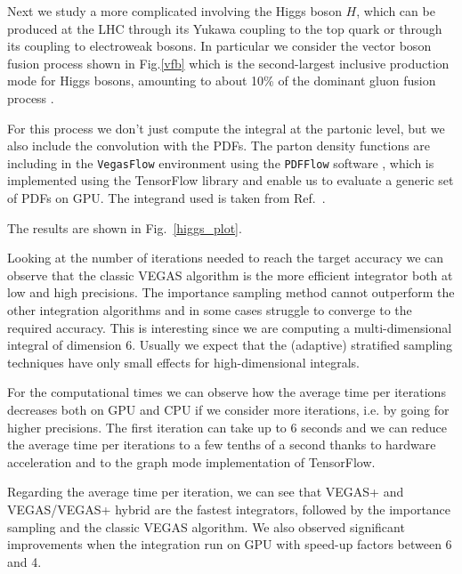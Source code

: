 \documentclass[../main/main.tex]{subfiles}
\begin{document}
Next we study a more complicated involving the Higgs boson $H$, which can be produced at the LHC through its Yukawa coupling to the top quark or through its coupling to electroweak bosons. In particular we consider the vector boson fusion process shown in Fig.\ref{vfb} which is the second-largest inclusive production mode for Higgs bosons, amounting to about 10\% of the dominant gluon fusion process \cite{Cruz_Martinez_2018}.

For this process we don't just compute the integral at the partonic level, but we also include the convolution with the PDFs. 
The parton density functions are including in the \texttt{VegasFlow} environment using the \texttt{PDFFlow} software \cite{Carrazza_2021,juan_m_cruz_martinez_2021_4903010}, which is implemented using the TensorFlow library and enable us to evaluate a generic set of PDFs on GPU. 
The integrand used is taken from Ref.~\cite{juan_m_cruz_martinez_2021_4903010}.

The results are shown in Fig.~\ref{higgs_plot}.

Looking at the number of iterations needed to reach the target accuracy we can observe that the classic VEGAS algorithm is the more efficient integrator both at low and high precisions. The importance sampling method cannot outperform the other integration algorithms and in some cases struggle to converge to the required accuracy. This is interesting since we are computing a multi-dimensional integral of dimension 6. Usually we expect that the (adaptive) stratified sampling techniques have only small effects for high-dimensional integrals.

For the computational times we can observe how the average time per iterations decreases both on GPU and CPU if we consider more iterations, i.e. by going for higher precisions. The first iteration can take up to 6 seconds and we can reduce the average time per iterations to a few tenths of a second thanks to hardware acceleration and to the graph mode implementation of TensorFlow.

Regarding the average time per iteration, we can see that VEGAS+ and VEGAS/VEGAS+ hybrid are the fastest integrators, followed by the importance sampling and the classic VEGAS algorithm. We also observed significant improvements when the integration run on GPU with speed-up factors between 6 and 4.

 
\end{document}
